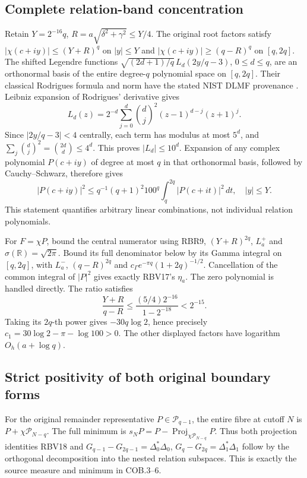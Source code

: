 \subsection{Complete relation-band concentration}

Retain $Y=2^{-16}q$, $R=a\sqrt{\delta^2+\gamma^2}\le Y/4$.
The original root factors satisfy
$|\chi(c+iy)|\le(Y+R)^q$ on $|y|\le Y$ and
$|\chi(c+iy)|\ge(q-R)^q$ on $[q,2q]$.
The shifted Legendre functions
$\sqrt{(2d+1)/q}\,L_d(2y/q-3)$, $0\le d\le q$,
are an orthonormal basis of the entire degree-$q$ polynomial
space on $[q,2q]$.  Their classical Rodrigues formula and norm
have the stated NIST DLMF provenance \cite{human:dlmf18}.
Leibniz expansion of Rodrigues' derivative gives
\[
 L_d(z)=2^{-d}\sum_{j=0}^d\binom dj^2
                              (z-1)^{d-j}(z+1)^j .
 \tag{RBR8}
\]
Since $|2y/q-3|<4$ centrally, each term has modulus at most
$5^d$, and $\sum_j\binom dj^2=\binom{2d}d\le4^d$.
This proves $|L_d|\le10^d$.
Expansion of any complex polynomial $P(c+iy)$ of degree at most
$q$ in that orthonormal basis, followed by Cauchy--Schwarz,
therefore gives
\[
 |P(c+iy)|^2\le q^{-1}(q+1)^2 100^q
                   \int_q^{2q}|P(c+it)|^2\,dt,\quad |y|\le Y .
 \tag{RBR9}
\]
This statement quantifies arbitrary linear combinations, not
individual relation polynomials.

For $F=\chi P$, bound the central numerator using RBR9,
$(Y+R)^{2q}$, $L_a^+$ and $\sigma(\mathbb R)=\sqrt{2\pi}$.
Bound its full denominator below by its Gamma integral on
$[q,2q]$, with $L_a^-$, $(q-R)^{2q}$ and
$c_\Gamma e^{-\pi q}(1+2q)^{-1/2}$.
Cancellation of the common integral of $|P|^2$ gives exactly
RBV17's $\eta_a$. The zero polynomial is handled directly.
The ratio satisfies
\[
 \frac{Y+R}{q-R}
 \le\frac{(5/4)2^{-16}}{1-2^{-18}}<2^{-15}.
 \tag{RBR10}
\]
Taking its $2q$-th power gives
$-30q\log2$, hence precisely
$c_1=30\log2-\pi-\log100>0$.
The other displayed factors have logarithm $O_h(a+\log q)$.

\subsection{Strict positivity of both original boundary forms}

For the original remainder representative $P\in\mathcal P_{q-1}$,
the entire fibre at cutoff $N$ is
$P+\chi\mathcal P_{N-q}$.  The full minimum is
$s_NP=P-\operatorname{Proj}_{\chi\mathcal P_{N-q}}P$.
Thus both projection identities RBV18 and
$G_{q-1}-G_{2q-1}=\Delta_0^*\Delta_0$,
$G_q-G_{2q}=\Delta_1^*\Delta_1$ follow by the orthogonal
decomposition into the nested relation subspaces. This is exactly
the source measure and minimum in COB.3--6.

